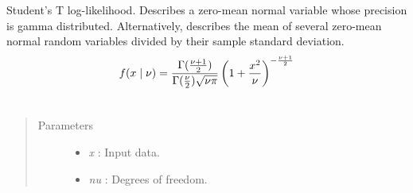 \documentclass[letterpaper,10pt,english]{sphinxmanual}
\begin{document}
\begin{fulllineitems}
\label{distributions:pymc.distributions.t_like}
Student's T log-likelihood. Describes a zero-mean normal variable
whose precision is gamma distributed. Alternatively, describes the
mean of several zero-mean normal random variables divided by their
sample standard deviation.
\begin{gather}
\begin{split}f(x \mid \nu) = \frac{\Gamma(\frac{\nu+1}{2})}{\Gamma(\frac{\nu}{2}) \sqrt{\nu\pi}} \left( 1 + \frac{x^2}{\nu} \right)^{-\frac{\nu+1}{2}}\end{split}\notag\\\begin{split}\end{split}\notag
\end{gather}\begin{quote}\begin{description}
\item[{Parameters }] \leavevmode\begin{itemize}
\item {} 
\emph{x} : Input data.

\item {} 
\emph{nu} : Degrees of freedom.

\end{itemize}

\end{description}\end{quote}

\end{fulllineitems}

\end{document}
